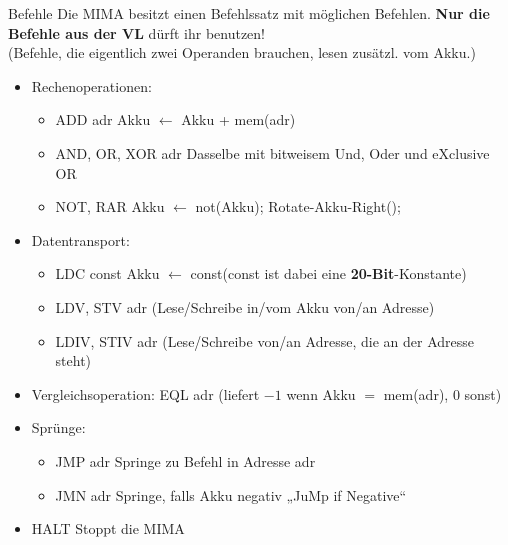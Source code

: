 \newcommand{\itemizeconfig}{\setlength{\parsep}{0pt}\setlength{\parskip}{0pt}\setlength{\topsep}{0pt}\setlength{\partopsep}{0pt}}
\newcommand{\explain}[1]{\hfill {\small #1 }}
\begin{frame}{Befehle}
	Die MIMA besitzt einen Befehlssatz mit möglichen Befehlen. %
	\textbf{Nur die Befehle aus der VL} dürft ihr benutzen! \\ 
	\smallskip
	(Befehle, die eigentlich zwei Operanden brauchen, lesen zusätzl. vom Akku.)
	{
	\begin{itemize}[<+->] \itemizeconfig
		\item Rechenoperationen:
		\begin{itemize} 
			\item ADD adr \explain{Akku $\leftarrow$ Akku + mem(adr)}
			\item AND, OR, XOR adr \explain{Dasselbe mit bitweisem Und, Oder und eXclusive OR}
			\item NOT, RAR \explain{Akku $\leftarrow$ not(Akku); \quad  Rotate-Akku-Right();}
		\end{itemize}
		\item Datentransport:
		\begin{itemize}
			\item LDC const \explain{Akku $\leftarrow$ const\quad (const ist dabei eine \textbf{20-Bit}-Konstante) }
			\item LDV, STV adr \explain{(Lese/Schreibe in/vom Akku von/an Adresse)}
			\item LDIV, STIV adr \explain{(Lese/Schreibe von/an Adresse, die an der Adresse steht)}
		\end{itemize}
		\item Vergleichsoperation: EQL adr \explain{(liefert $-1$ wenn Akku $=$ mem(adr), 0 sonst)}
		\item Sprünge:
		\begin{itemize}
			\item JMP adr \explain{Springe zu Befehl in Adresse adr}
			\item JMN adr \explain{Springe, falls Akku negativ \quad „JuMp if Negative“}
		\end{itemize}
		\item HALT \explain{Stoppt die MIMA}
	\end{itemize}}
\end{frame}

